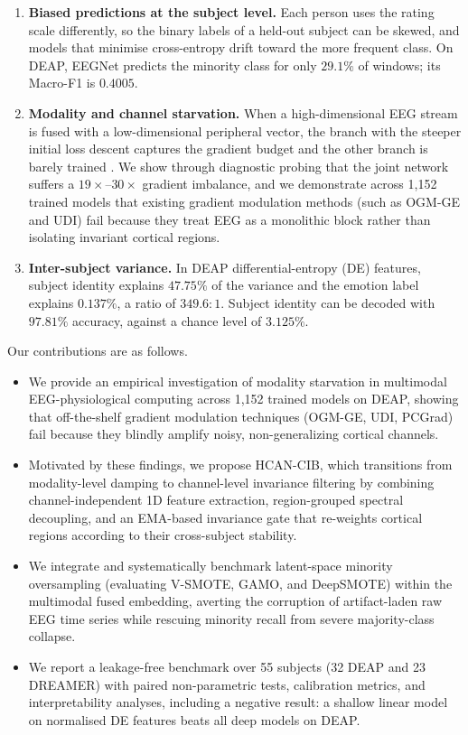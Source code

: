 \documentclass[a4paper,fleqn]{cas-sc}
\begin{document}
\begin{enumerate}
\item \textbf{Biased predictions at the subject level.} Each person uses the rating scale differently, so the binary labels of a held-out subject can be skewed, and models that minimise cross-entropy drift toward the more frequent class. On DEAP, EEGNet predicts the minority class for only $29.1\%$ of windows; its Macro-F1 is $0.4005$.
\item \textbf{Modality and channel starvation.} When a high-dimensional EEG stream is fused with a low-dimensional peripheral vector, the branch with the steeper initial loss descent captures the gradient budget and the other branch is barely trained \citep{pezeshki2021gradient,huang2022modality,fan2023pmr}. We show through diagnostic probing that the joint network suffers a $19\times$--$30\times$ gradient imbalance, and we demonstrate across 1,152 trained models that existing gradient modulation methods (such as OGM-GE and UDI) fail because they treat EEG as a monolithic block rather than isolating invariant cortical regions.
\item \textbf{Inter-subject variance.} In DEAP differential-entropy (DE) features, subject identity explains $47.75\%$ of the variance and the emotion label explains $0.137\%$, a ratio of $349.6{:}1$. Subject identity can be decoded with $97.81\%$ accuracy, against a chance level of $3.125\%$.
\end{enumerate}

Our contributions are as follows.
\begin{itemize}
\item We provide an empirical investigation of modality starvation in multimodal EEG-physiological computing across 1,152 trained models on DEAP, showing that off-the-shelf gradient modulation techniques (OGM-GE, UDI, PCGrad) fail because they blindly amplify noisy, non-generalizing cortical channels.
\item Motivated by these findings, we propose HCAN-CIB, which transitions from modality-level damping to channel-level invariance filtering by combining channel-independent 1D feature extraction, region-grouped spectral decoupling, and an EMA-based invariance gate that re-weights cortical regions according to their cross-subject stability.
\item We integrate and systematically benchmark latent-space minority oversampling (evaluating V-SMOTE, GAMO, and DeepSMOTE) within the multimodal fused embedding, averting the corruption of artifact-laden raw EEG time series while rescuing minority recall from severe majority-class collapse.
\item We report a leakage-free benchmark over 55 subjects (32 DEAP and 23 DREAMER) with paired non-parametric tests, calibration metrics, and interpretability analyses, including a negative result: a shallow linear model on normalised DE features beats all deep models on DEAP.
\end{itemize}
\end{document}
